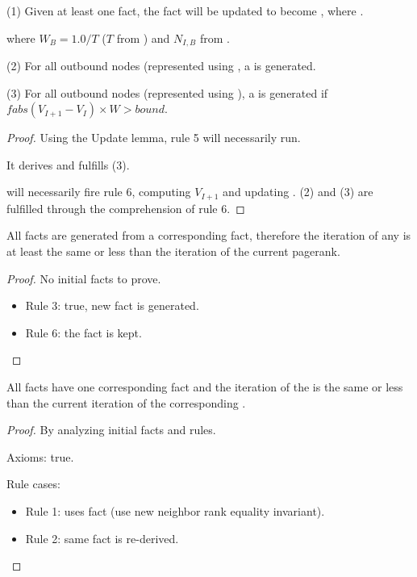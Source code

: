 \begin{lemma}
(1) Given at least one  fact, the  fact will be updated to become , where .

where $W_B = 1.0/T$ ($T$ from )
and $N_{I,B}$ from .

(2) For all  outbound nodes (represented using , a  is generated.

(3) For all  outbound nodes (represented using ), a  is generated if 
$fabs(V_{I + 1} - V_{I}) \times W > bound$.
\end{lemma}
\begin{proof}
Using the Update lemma, rule 5 will necessarily run.

It derives  and
fulfills (3).

 will necessarily fire rule 6,
computing $V_{I+1}$ and updating . (2) and (3) are fulfilled
through the comprehension of rule 6.
\end{proof}

\begin{invariant}
All  facts are generated from a corresponding
 fact, therefore the iteration of any
 is at least the same or less than the iteration of
the current pagerank.
\end{invariant}
\begin{proof}
No initial facts to prove.

\begin{itemize}
   \item Rule 3: true, new fact is generated.
   \item Rule 6: the fact is kept.
\end{itemize}
\end{proof}

\begin{invariant}
All  facts have one corresponding
 fact and the iteration of the 
is the same or less than the current iteration of the corresponding
.
\end{invariant}
\begin{proof}
By analyzing initial facts and rules.

Axioms: true.

Rule cases:

\begin{itemize}
   \item Rule 1: uses  fact (use new neighbor rank
         equality invariant).
   \item Rule 2: same fact is re-derived.
\end{itemize}
\end{proof}

